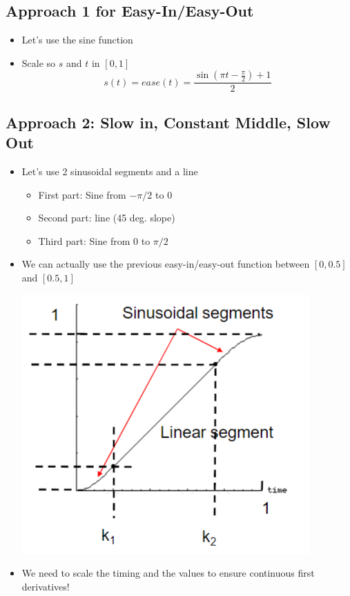 \documentclass{article}
\begin{document}
\subsection*{Approach 1 for Easy-In/Easy-Out}
\begin{itemize}
    \item Let's use the sine function
    \item Scale so $s$ and $t$ in $[0, 1]$
    \[s(t) = ease(t) = \frac{\sin(\pi t - \frac{\pi}{2}) + 1}{2}\]
\end{itemize}
\subsection*{Approach 2: Slow in, Constant Middle, Slow Out}
\begin{itemize}
    \item Let's use 2 sinusoidal segments and a line
    \begin{itemize}
        \item First part: Sine from $-\pi/2$ to $0$
        \item Second part: line (45 deg. slope)
        \item Third part: Sine from $0$ to $\pi/2$
    \end{itemize}
    \item We can actually use the previous easy-in/easy-out function between $[0, 0.5]$ and $[0.5, 1]$
    \begin{center}
        \includegraphics*[scale=0.7]{W4_7.png}
    \end{center}
    \item We need to scale the timing and the values to ensure continuous first derivatives!
\end{itemize}
\end{document}
